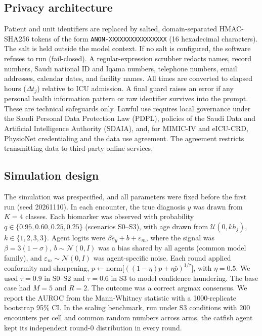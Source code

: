 \documentclass[11pt]{article}
\begin{document}
\subsection{Privacy architecture}
Patient and unit identifiers are replaced by salted, domain-separated HMAC-SHA256 tokens of the form
\texttt{ANON-}\allowbreak\texttt{XXXXXXXXXXXXXXXX} (16 hexadecimal characters). The salt is held outside the model
context. If no salt is configured, the software refuses to run (fail-closed). A regular-expression scrubber redacts
names, record numbers, Saudi national ID and Iqama numbers, telephone numbers, email addresses, calendar dates, and
facility names. All times are converted to elapsed hours ($\Delta t_j$) relative to ICU admission. A final guard
raises an error if any personal health information pattern or raw identifier survives into the prompt. These are
technical safeguards only. Lawful use requires local governance under the Saudi Personal Data Protection Law (PDPL),
policies of the Saudi Data and Artificial Intelligence Authority (SDAIA), and, for MIMIC-IV and eICU-CRD, PhysioNet
credentialing and the data use agreement. The agreement restricts transmitting data to third-party online services.\cite{mimic4,eicu}

\subsection{Simulation design}
The simulation was prespecified, and all parameters were fixed before the first run (seed 20261110). In each encounter,
the true diagnosis $y$ was drawn from $K=4$ classes. Each biomarker was observed with probability
$q\in\{0.95,0.60,0.25,0.25\}$ (scenarios S0--S3), with age drawn from $\mathcal U(0,kh_j)$, $k\in\{1,2,3,3\}$.
Agent logits were $\beta e_y+b+\varepsilon_m$, where the signal was $\beta=3(1-\sigma)$, $b\sim\mathcal N(0,I)$ was a bias
shared by all agents (common model family), and $\varepsilon_m\sim\mathcal N(0,I)$ was agent-specific noise.
Each round applied conformity and sharpening, $p\leftarrow\mathrm{norm}\bigl[((1-\eta)p+\eta\bar p)^{1/\tau}\bigr]$, with
$\eta=0.5$. We used $\tau=0.9$ in S0--S2 and $\tau=0.6$ in S3 to model confidence laundering. The base case had $M=5$
and $R=2$. The outcome was a correct argmax consensus. We report the AUROC from the Mann-Whitney statistic with a
1000-replicate bootstrap 95\% CI. In the scaling benchmark, run under S3 conditions with 200 encounters per cell and
common random numbers across arms, the catfish agent kept its independent round-0 distribution in every round.
\end{document}
